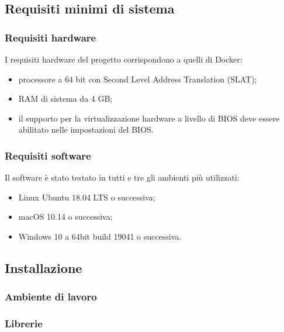 \subsection{Requisiti minimi di sistema}

	\subsubsection{Requisiti hardware}
	I requisiti hardware del progetto corrispondono a quelli di Docker:
	\begin{itemize}
		\item processore a 64 bit con Second Level Address Translation (SLAT);
		\item RAM di sistema da 4 GB;
		\item il supporto per la virtualizzazione hardware a livello di BIOS deve essere abilitato nelle impostazioni del BIOS.
	\end{itemize}  
	
	\subsubsection{Requisiti software}
	Il software è stato testato in tutti e tre gli ambienti più utilizzati:
	\begin{itemize}
		\item Linux Ubuntu 18.04 LTS o successiva; 
		\item macOS 10.14 o successiva;
		\item Windows 10 a 64bit build 19041 o successiva.
	\end{itemize}  
	
\subsection{Installazione}

	\subsubsection{Ambiente di lavoro}

	\subsubsection{Librerie}
